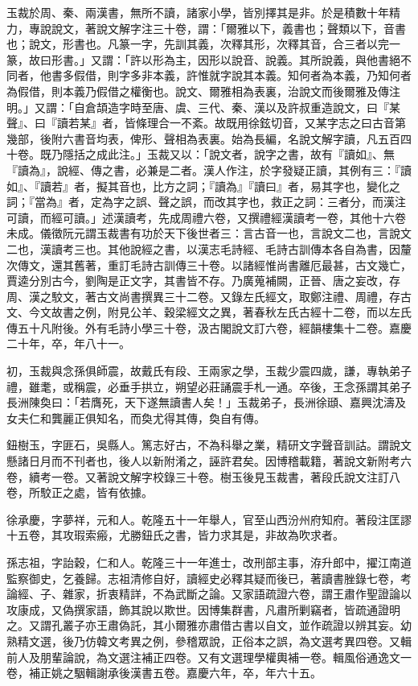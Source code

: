 \begin{pinyinscope}
玉裁於周、秦、兩漢書，無所不讀，諸家小學，皆別擇其是非。於是積數十年精力，專說說文，著說文解字注三十卷，謂：「爾雅以下，義書也；聲類以下，音書也；說文，形書也。凡篆一字，先訓其義，次釋其形，次釋其音，合三者以完一篆，故曰形書。」又謂：「許以形為主，因形以說音、說義。其所說義，與他書絕不同者，他書多假借，則字多非本義，許惟就字說其本義。知何者為本義，乃知何者為假借，則本義乃假借之權衡也。說文、爾雅相為表裏，治說文而後爾雅及傳注明。」又謂：「自倉頡造字時至唐、虞、三代、秦、漢以及許叔重造說文，曰『某聲』、曰『讀若某』者，皆條理合一不紊。故既用徐鉉切音，又某字志之曰古音第幾部，後附六書音均表，俾形、聲相為表裏。始為長編，名說文解字讀，凡五百四十卷。既乃隱括之成此注。」玉裁又以：「說文者，說字之書，故有『讀如』、無『讀為』，說經、傳之書，必兼是二者。漢人作注，於字發疑正讀，其例有三：『讀如』、『讀若』者，擬其音也，比方之詞；『讀為』『讀曰』者，易其字也，變化之詞；『當為』者，定為字之誤、聲之誤，而改其字也，救正之詞：三者分，而漢注可讀，而經可讀。」述漢讀考，先成周禮六卷，又撰禮經漢讀考一卷，其他十六卷未成。儀徵阮元謂玉裁書有功於天下後世者三：言古音一也，言說文二也，言說文二也，漢讀考三也。其他說經之書，以漢志毛詩經、毛詩古訓傳本各自為書，因釐次傳文，還其舊著，重訂毛詩古訓傳三十卷。以諸經惟尚書離厄最甚，古文幾亡，賈逵分別古今，劉陶是正文字，其書皆不存。乃廣蒐補闕，正晉、唐之妄改，存周、漢之駮文，著古文尚書撰異三十二卷。又錄左氏經文，取鄭注禮、周禮，存古文、今文故書之例，附見公羊、穀梁經文之異，著春秋左氏古經十二卷，而以左氏傳五十凡附後。外有毛詩小學三十卷，汲古閣說文訂六卷，經韻樓集十二卷。嘉慶二十年，卒，年八十一。

初，玉裁與念孫俱師震，故戴氏有段、王兩家之學，玉裁少震四歲，謙，專執弟子禮，雖耄，或稱震，必垂手拱立，朔望必莊誦震手札一通。卒後，王念孫謂其弟子長洲陳奐曰：「若膺死，天下遂無讀書人矣！」玉裁弟子，長洲徐頲、嘉興沈濤及女夫仁和龔麗正俱知名，而奐尤得其傳，奐自有傳。

鈕樹玉，字匪石，吳縣人。篤志好古，不為科舉之業，精研文字聲音訓詁。謂說文懸諸日月而不刊者也，後人以新附淆之，誣許君矣。因博稽載籍，著說文新附考六卷，續考一卷。又著說文解字校錄三十卷。樹玉後見玉裁書，著段氏說文注訂八卷，所駮正之處，皆有依據。

徐承慶，字夢祥，元和人。乾隆五十一年舉人，官至山西汾州府知府。著段注匡謬十五卷，其攻瑕索瘢，尤勝鈕氏之書，皆力求其是，非故為吹求者。

孫志祖，字詒穀，仁和人。乾隆三十一年進士，改刑部主事，洊升郎中，擢江南道監察御史，乞養歸。志祖清修自好，讀經史必釋其疑而後已，著讀書脞錄七卷，考論經、子、雜家，折衷精詳，不為武斷之論。又家語疏證六卷，謂王肅作聖證論以攻康成，又偽撰家語，飾其說以欺世。因博集群書，凡肅所剿竊者，皆疏通證明之。又謂孔叢子亦王肅偽託，其小爾雅亦肅借古書以自文，並作疏證以辨其妄。幼熟精文選，後乃仿韓文考異之例，參稽眾說，正俗本之誤，為文選考異四卷。又輯前人及朋輩論說，為文選注補正四卷。又有文選理學權輿補一卷。輯風俗通逸文一卷，補正姚之駰輯謝承後漢書五卷。嘉慶六年，卒，年六十五。


\end{pinyinscope}
